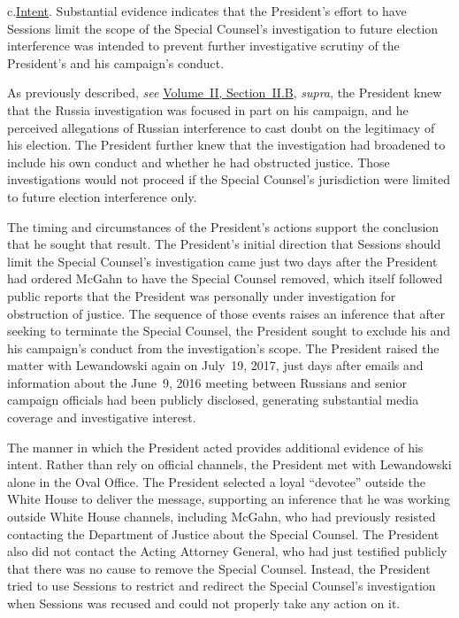 c.\qquad\underline{Intent}.
Substantial evidence indicates that the President's effort to have Sessions limit the scope of the Special Counsel's investigation to future election interference was intended to prevent further investigative scrutiny of the President's and his campaign's conduct.

As previously described, \textit{see} \hyperlink{subsection.2.2.2}{Volume~II, Section~II.B}, \textit{supra}, the President knew that the Russia investigation was focused in part on his campaign, and he perceived allegations of Russian interference to cast doubt on the legitimacy of his election.
The President further knew that the investigation had broadened to include his own conduct and whether he had obstructed justice.
Those investigations would not proceed if the Special Counsel's jurisdiction were limited to future election interference only.

The timing and circumstances of the President's actions support the conclusion that he sought that result.
The President's initial direction that Sessions should limit the Special Counsel's investigation came just two days after the President had ordered McGahn to have the Special Counsel removed, which itself followed public reports that the President was personally under investigation for obstruction of justice.
The sequence of those events raises an inference that after seeking to terminate the Special Counsel, the President sought to exclude his and his campaign's conduct from the investigation's scope.
The President raised the matter with Lewandowski again on July~19, 2017, just days after emails and information about the June~9, 2016 meeting between Russians and senior campaign officials had been publicly disclosed, generating substantial media coverage and investigative interest.

The manner in which the President acted provides additional evidence of his intent.
Rather than rely on official channels, the President met with Lewandowski alone in the Oval Office.
The President selected a loyal ``devotee'' outside the White House to deliver the message, supporting an inference that he was working outside White House channels, including McGahn, who had previously resisted contacting the Department of Justice about the Special Counsel.
The President also did not contact the Acting Attorney General, who had just testified publicly that there was no cause to remove the Special Counsel.
Instead, the President tried to use Sessions to restrict and redirect the Special Counsel's investigation when Sessions was recused and could not properly take any action on it.

